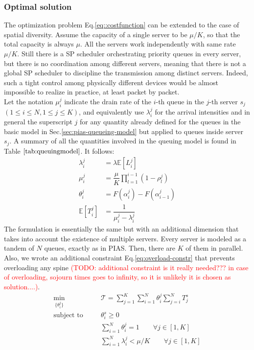 \subsubsection{Optimal solution}
The optimization problem Eq.\eqref{eq::costfunction} can be extended to the case of spatial diversity.
Assume the capacity of a single server to be $\mu/K$, so that the total capacity is always $\mu$. All the servers work independently with same rate $\mu / K$. Still there is a SP scheduler orchestrating priority queues in every server, but there is no coordination among different servers, meaning that there is not a global SP scheduler to discipline the transmission among distinct servers. Indeed, such a tight control among physically different devices would be almost impossible to realize in practice, at least packet by packet. \\
Let the notation $\mu_i^j$ indicate the drain rate of the $i$-th queue in the $j$-th server $s_j$ $(1 \le i \le N, 1 \le j \le K)$, and equivalently use $\lambda_i^j$ for the arrival intensities and in general the superscript $j$ for any quantity already defined for the queues in the basic model in Sec.\ref{sec:pias-queueing-model} but applied to queues inside server $s_j$. A summary of all the quantities involved in the queuing model is found in Table $\ref{tab:queuingmodel}$. It follows:
\begin{align*}
\lambda_i^j &= \lambda \mathbb{E}[L_i^j] \\
\mu_i^j &=  \dfrac{\mu}{K} \prod_{l=1}^{i-1}(1-\rho_l^j) \\
\theta_i^j &= F(\alpha_i^j) - F(\alpha_{i-1}^j)	\\
\mathbb{E}[T_i^j] &= \dfrac{1}{\mu_i^j - \lambda_i^j}
\end{align*}
The formulation is essentially the same but with an additional dimension that takes into account the existence of multiple servers. Every server is modeled as a tandem of $N$ queues, exactly as in PIAS. Then, there are $K$ of them in parallel. Also, we wrote an additional constraint Eq.\eqref{eq:overload-constr} that prevents overloading any spine \textcolor{red}{(TODO: additional constraint is it really needed??? in case of overloading, sojourn times goes to infinity, so it is unlikely it is chosen as solution....)}. 
\begin{subequations}
	\begin{align}
	&\underset{\{\theta_i^j\}}{\text{min}} & \quad  & \mathcal{T} =	\sum_{j=1}^{K}\sum_{i=1}^{N} \theta_i^j \sum_{j=i}^{N}T^s_j 					\label{eq::costfunction-spatial} & \\
	&\text{subject to} & \quad  &\theta_i^s \ge 0 & \\
	& & & \sum_{i=1}^{N} \theta_i^j = 1  \qquad \forall j \in [1,K] &  \\
	& & & \sum_{i=1}^{N}  \lambda_i^j < \mu/K  \qquad \forall j \in [1,K] & \label{eq:overload-constr}
	\end{align}
	
\end{subequations}
